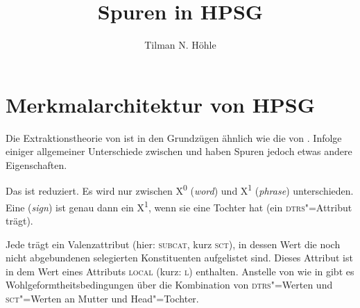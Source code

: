 \documentclass[output=paper]{LSP/langsci}
\author{Tilman N. Höhle}
\title{Spuren in {HPSG}}
\begin{document}
\label{chap-spuren-hpsg}
\setcounter{randcount}{0}

\renewcommand*{\thefootnote}{\fnsymbol{footnote}}
\setcounter{footnote}{4}

\renewcommand*{\thefootnote}{\arabic{footnote}}
\setcounter{footnote}{0}

\section{Merkmalarchitektur von HPSG}
\label{sec:16-1}

{\randnum}Die Extraktionstheorie von  ist in den Grundzügen ähnlich wie die
von \citet{gazdaretal1985a}. Infolge einiger allgemeiner Unterschiede zwischen 
und  haben Spuren jedoch etwas andere Eigenschaften.

{\randnum}Das  ist reduziert. Es wird nur zwischen X\textsuperscript{0} (\textit{word}) und
X\textsuperscript{1} (\mbox{\textit{phrase}}) unterschieden. Eine  (\textit{sign}) ist genau dann
ein X\textsuperscript{1}, wenn sie eine Tochter hat (ein \textsc{dtrs}"=Attribut trägt).

{\randnum}Jede  trägt ein Valenzattribut
(hier: \textsc{subcat}, kurz \textsc{sct}), in dessen Wert die noch
nicht abgebundenen selegierten Konstituenten aufgelistet sind. Dieses
Attribut ist in dem Wert eines Attributs \textsc{local} (kurz:
\textsc{l}) enthalten. Anstelle von  wie in 
gibt es Wohlgeformtheitsbedingungen über die Kombination von
\textsc{dtrs}"=Werten und \textsc{sct}"=Werten an Mutter und Head"=Tochter.
\end{document}
